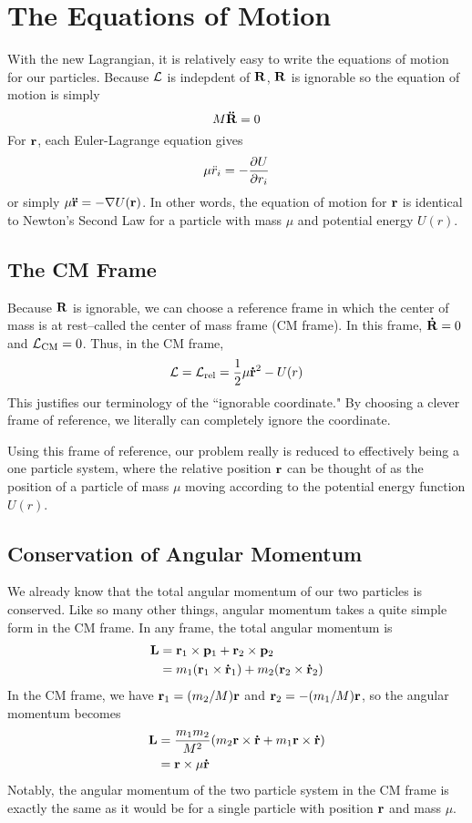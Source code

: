 \section{The Equations of Motion}
With the new Lagrangian, it is relatively easy to write the equations of motion for our particles. Because $\mathcal{L}$ is indepdent of $\mathbf{R}$, $\mathbf{R}$ is ignorable so the equation of motion is simply
\[ M\mathbf{\ddot R} = 0\]
For $\mathbf{r}$, each Euler-Lagrange equation gives
\[\mu {\ddot r_i} = -\pdv{U}{r_i}\]
or simply $\mu \mathbf{\ddot r} = -\nabla U(\mathbf{r})$. In other words, the equation of motion for $\mathbf{r}$ is identical to Newton's Second Law for a particle with mass $\mu$ and potential energy $U(r)$. 
\subsection*{The CM Frame}
Because $\mathbf{R}$ is ignorable, we can choose a reference frame in which the center of mass is at rest--called the center of mass frame (CM frame). In this frame, $\mathbf{\dot R} = 0$ and $\mathcal{L}_\text{CM} = 0$. Thus, in the CM frame,
\[ \mathcal{L} = \mathcal{L}_\text{rel} = \frac{1}{2}\mu \mathbf{\dot r}^2 - U(r) \]
This justifies our terminology of the ``ignorable coordinate." By choosing a clever frame of reference, we literally can completely ignore the coordinate.

Using this frame of reference, our problem really is reduced to effectively being a one particle system, where the relative position $\mathbf{r}$ can be thought of as the position of a particle of mass $\mu$ moving according to the potential energy function $U(r)$. 
\subsection*{Conservation of Angular Momentum}
We already know that the total angular momentum of our two particles is conserved. Like so many other things, angular momentum takes a quite simple form in the CM frame. In any frame, the total angular momentum is
\begin{align*}
    \mathbf{L} &= \mathbf{r}_1 \times \mathbf{p}_1 + \mathbf{r}_2 \times \mathbf{p}_2 \\
    &= m_1 (\mathbf{r}_1 \times \mathbf{\dot r}_1) + m_2(\mathbf{r}_2 \times \mathbf{\dot r}_2)
\end{align*}
In the CM frame, we have $\mathbf{r}_1 = (m_2/M) \mathbf{r}$ and $\mathbf{r}_2 = -(m_1/M) \mathbf{r}$, so the angular momentum becomes
\begin{align*}
    \mbf L &= \frac{m_1m_2}{M^2} \pqty{m_2 \mbf r \times \mbf{\dot r} + m_1\mbf r \times \mbf{\dot r}} \\
    &= \mbf r \times \mu \mbf{\dot r}
\end{align*}
Notably, the angular momentum of the two particle system in the CM frame is exactly the same as it would be for a single particle with position $\mathbf{r}$ and mass $\mu$. 

